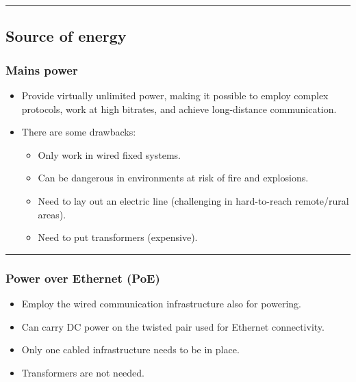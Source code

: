 \documentclass[
]{article}
\providecommand{\tightlist}{%
  \setlength{\itemsep}{0pt}\setlength{\parskip}{0pt}}
\begin{document}
\begin{center}\rule{0.5\linewidth}{0.5pt}\end{center}

\subsection{Source of energy}\label{source-of-energy}

\subsubsection{Mains power}\label{mains-power}

\begin{itemize}
\tightlist
\item
  Provide virtually unlimited power, making it possible to employ
  complex protocols, work at high bitrates, and achieve long-distance
  communication.
\item
  There are some drawbacks:

  \begin{itemize}
  \tightlist
  \item
    Only work in wired fixed systems.
  \item
    Can be dangerous in environments at risk of fire and explosions.
  \item
    Need to lay out an electric line (challenging in hard-to-reach
    remote/rural areas).
  \item
    Need to put transformers (expensive).
  \end{itemize}
\end{itemize}

\begin{center}\rule{0.5\linewidth}{0.5pt}\end{center}

\subsubsection{Power over Ethernet (PoE)}\label{power-over-ethernet-poe}

\begin{itemize}
\tightlist
\item
  Employ the wired communication infrastructure also for powering.
\item
  Can carry DC power on the twisted pair used for Ethernet connectivity.
\item
  Only one cabled infrastructure needs to be in place.
\item
  Transformers are not needed.
\end{itemize}
\end{document}
